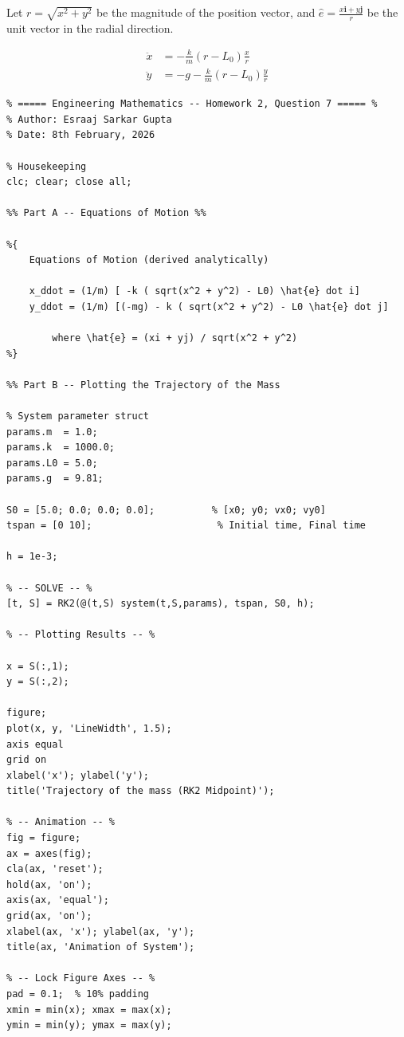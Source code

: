 \documentclass{article}
\begin{document}
Let $r = \sqrt{x^2 + y^2}$ be the magnitude of the position vector, and $\hat{e} = \frac{x\mathbf{i} + y\mathbf{j}}{r}$ be the unit vector in the radial direction.

\begin{align}
    \ddot{x} &= -\frac{k}{m} \left( r - L_0 \right) \frac{x}{r} \label{eqn:question7_eomx}\\
    \ddot{y} &= -g - \frac{k}{m} \left( r - L_0 \right) \frac{y}{r} \label{eqn:question7_eomy}
\end{align}

\begin{lstlisting}
% ===== Engineering Mathematics -- Homework 2, Question 7 ===== %
% Author: Esraaj Sarkar Gupta
% Date: 8th February, 2026

% Housekeeping
clc; clear; close all;

%% Part A -- Equations of Motion %%

%{
    Equations of Motion (derived analytically)

    x_ddot = (1/m) [ -k ( sqrt(x^2 + y^2) - L0) \hat{e} dot i]
    y_ddot = (1/m) [(-mg) - k ( sqrt(x^2 + y^2) - L0 \hat{e} dot j]
    
        where \hat{e} = (xi + yj) / sqrt(x^2 + y^2)
%}

%% Part B -- Plotting the Trajectory of the Mass

% System parameter struct
params.m  = 1.0;
params.k  = 1000.0;
params.L0 = 5.0;
params.g  = 9.81;

S0 = [5.0; 0.0; 0.0; 0.0];          % [x0; y0; vx0; vy0]
tspan = [0 10];                      % Initial time, Final time

h = 1e-3;

% -- SOLVE -- %
[t, S] = RK2(@(t,S) system(t,S,params), tspan, S0, h);

% -- Plotting Results -- %

x = S(:,1);
y = S(:,2);

figure;
plot(x, y, 'LineWidth', 1.5);
axis equal
grid on
xlabel('x'); ylabel('y');
title('Trajectory of the mass (RK2 Midpoint)');

% -- Animation -- %
fig = figure;
ax = axes(fig);
cla(ax, 'reset');
hold(ax, 'on');
axis(ax, 'equal');
grid(ax, 'on');
xlabel(ax, 'x'); ylabel(ax, 'y');
title(ax, 'Animation of System');

% -- Lock Figure Axes -- %
pad = 0.1;  % 10% padding
xmin = min(x); xmax = max(x);
ymin = min(y); ymax = max(y);


\end{lstlisting}
\end{document}
